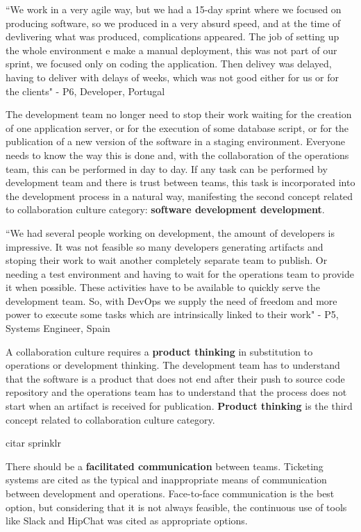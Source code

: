 ``We work in a very agile way, but we had a 15-day sprint where we focused on
producing software, so we produced in a very absurd speed, and at the time of
devlivering what was produced, complications appeared. The job of setting up
the whole environment e make a manual deployment, this was not part of our
sprint, we focused only on coding the application. Then delivey was delayed,
having to deliver with delays of weeks, which was not good either for us or for
the clients" - P6, Developer, Portugal

The development team no longer need to stop their work waiting for the creation
of one application server, or for the execution of some database script, or for
the publication of a new version of the software in a staging environment.
Everyone needs to know the way this is done and, with the collaboration of the
operations team, this can be performed in day to day. If any task can be
performed by development team and there is trust between teams, this task is
incorporated into the development process in a natural way, manifesting the
second concept related to collaboration culture category: \textbf{software
development development}.

``We had several people working on development, the amount of developers is
impressive. It was not feasible so many developers generating artifacts and
stoping their work to wait another completely separate team to publish. Or
needing a test environment and having to wait for the operations team to
provide it when possible. These activities have to be available to quickly
serve the development team. So, with DevOps we supply the need of freedom and
more power to execute some tasks which are intrinsically linked to their work"
- P5, Systems Engineer, Spain

A collaboration culture requires a \textbf{product thinking} in substitution to
operations or development thinking. The development team has to understand that
the software is a product that does not end after their push to source code
repository and the operations team has to understand that the process does not
start when an artifact is received for publication. \textbf{Product thinking}
is the third concept related to collaboration culture category.

citar sprinklr

There should be a \textbf{facilitated communication} between teams. Ticketing
systems are cited as the typical and inappropriate means of communication
between development and operations. Face-to-face communication is the best
option, but considering that it is not always feasible, the continuous use of
tools like Slack and HipChat was cited as appropriate options.

